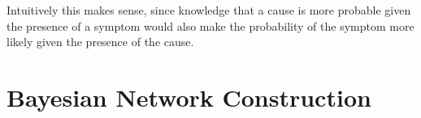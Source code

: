 Intuitively this makes sense, since knowledge that a cause is more probable given the presence of a symptom would also make the probability of the symptom more likely given the presence of the cause.

\section{Bayesian Network Construction}

%
